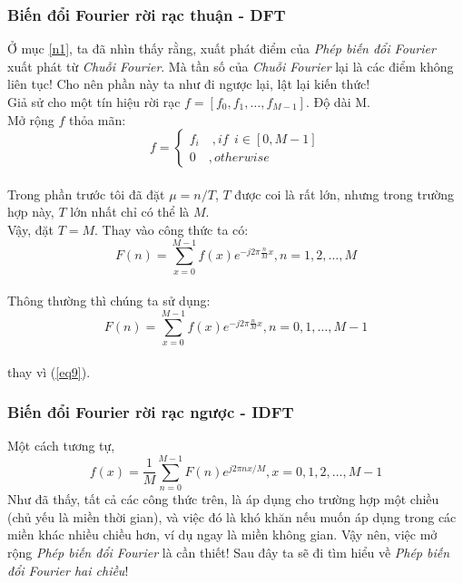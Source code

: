 \documentclass{article}
\begin{document}
        \subsubsection*{Biến đổi Fourier rời rạc thuận - DFT}
        Ở mục \ref{n1}, ta đã nhìn thấy rằng, xuất phát điểm của \textit{Phép biến đổi Fourier} xuất phát từ \textit{Chuỗi Fourier}. Mà tần số của \textit{Chuỗi Fourier} lại là các điểm không liên tục! Cho nên phần này ta như đi ngược lại, lật lại kiến thức!\\
        Giả sử cho một tín hiệu rời rạc $f = [f_0, f_1,\ldots, f_{M-1}]$. Độ dài M.\\
        Mở rộng $f$ thỏa mãn:
        \begin{equation}
            f = 
            \begin{cases}
            f_i\quad, if \phantom{r}i \in [0, M-1]\\
            0\quad, otherwise
            \end{cases}
        \end{equation}
        \\Trong phần trước tôi đã đặt $\mu = n/T$, $T$ được coi là rất lớn, nhưng trong trường hợp này, $T$ lớn nhất chỉ có thể là $M$.\\
        Vậy, đặt $T = M$. Thay vào công thức ta có:
        \begin{equation}
        F(n) = \sum_{x=0}^{M-1}f(x)e^{-j2\pi \frac{n}{M}x}, n = 1, 2, \ldots, M
        \label{eq9}
        \end{equation}
        \\ Thông thường thì chúng ta sử dụng:
                \begin{equation}
        F(n) = \sum_{x=0}^{M-1}f(x)e^{-j2\pi \frac{n}{M}x}, n = 0, 1, \ldots, M-1
        \label{eq10}
        \end{equation}
        \\ thay vì (\ref{eq9}).\\
        \subsubsection*{Biến đổi Fourier rời rạc ngược - IDFT}
        Một cách tương tự, 
        \begin{equation}
            f(x) = \frac{1}{M}\sum_{n=0}^{M-1} F(n)e^{j2\pi nx/M}, x = 0, 1, 2, \ldots, M-1
        \end{equation}
        Như đã thấy, tất cả các công thức trên, là áp dụng cho trường hợp một chiều (chủ yếu là miền thời gian), và việc đó là khó khăn nếu muốn áp dụng trong các miền khác nhiều chiều hơn, ví dụ ngay là miền không gian. Vậy nên, việc mở rộng \textit{Phép biến đổi Fourier} là cần thiết! Sau đây ta sẽ đi tìm hiểu về \textit{Phép biến đổi Fourier hai chiều}!
\end{document}
